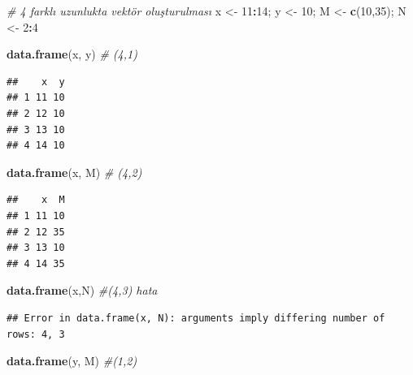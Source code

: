 \documentclass[
  oneside]{book}
\newenvironment{Shaded}{\begin{snugshade}}{\end{snugshade}}
\newcommand{\CommentTok}[1]{\textcolor[rgb]{0.56,0.35,0.01}{\textit{#1}}}
\newcommand{\DecValTok}[1]{\textcolor[rgb]{0.00,0.00,0.81}{#1}}
\newcommand{\FunctionTok}[1]{\textcolor[rgb]{0.13,0.29,0.53}{\textbf{#1}}}
\newcommand{\NormalTok}[1]{#1}
\newcommand{\OtherTok}[1]{\textcolor[rgb]{0.56,0.35,0.01}{#1}}
\newcommand{\SpecialCharTok}[1]{\textcolor[rgb]{0.81,0.36,0.00}{\textbf{#1}}}
\begin{document}
\begin{Shaded}
\begin{Highlighting}[]
\CommentTok{\# 4 farklı uzunlukta vektör oluşturulması}
\NormalTok{x }\OtherTok{\textless{}{-}} \DecValTok{11}\SpecialCharTok{:}\DecValTok{14}\NormalTok{; y }\OtherTok{\textless{}{-}} \DecValTok{10}\NormalTok{; M }\OtherTok{\textless{}{-}} \FunctionTok{c}\NormalTok{(}\DecValTok{10}\NormalTok{,}\DecValTok{35}\NormalTok{); N }\OtherTok{\textless{}{-}} \DecValTok{2}\SpecialCharTok{:}\DecValTok{4}
\end{Highlighting}
\end{Shaded}

\begin{Shaded}
\begin{Highlighting}[]
\FunctionTok{data.frame}\NormalTok{(x, y) }\CommentTok{\# (4,1)}
\end{Highlighting}
\end{Shaded}

\begin{verbatim}
##    x  y
## 1 11 10
## 2 12 10
## 3 13 10
## 4 14 10
\end{verbatim}

\begin{Shaded}
\begin{Highlighting}[]
\FunctionTok{data.frame}\NormalTok{(x, M) }\CommentTok{\# (4,2)}
\end{Highlighting}
\end{Shaded}

\begin{verbatim}
##    x  M
## 1 11 10
## 2 12 35
## 3 13 10
## 4 14 35
\end{verbatim}

\begin{Shaded}
\begin{Highlighting}[]
\FunctionTok{data.frame}\NormalTok{(x,N)  }\CommentTok{\#(4,3) hata}
\end{Highlighting}
\end{Shaded}

\begin{verbatim}
## Error in data.frame(x, N): arguments imply differing number of rows: 4, 3
\end{verbatim}

\begin{Shaded}
\begin{Highlighting}[]
\FunctionTok{data.frame}\NormalTok{(y, M) }\CommentTok{\#(1,2)}
\end{Highlighting}
\end{Shaded}
\end{document}
